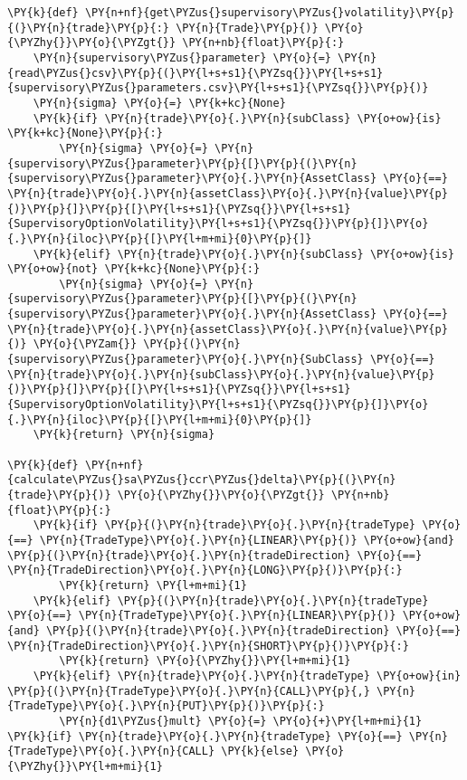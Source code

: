     \begin{tcolorbox}[breakable, size=fbox, boxrule=1pt, pad at break*=1mm,colback=cellbackground, colframe=cellborder]
\begin{Verbatim}[commandchars=\\\{\}]
\PY{k}{def} \PY{n+nf}{get\PYZus{}supervisory\PYZus{}volatility}\PY{p}{(}\PY{n}{trade}\PY{p}{:} \PY{n}{Trade}\PY{p}{)} \PY{o}{\PYZhy{}}\PY{o}{\PYZgt{}} \PY{n+nb}{float}\PY{p}{:}
    \PY{n}{supervisory\PYZus{}parameter} \PY{o}{=} \PY{n}{read\PYZus{}csv}\PY{p}{(}\PY{l+s+s1}{\PYZsq{}}\PY{l+s+s1}{supervisory\PYZus{}parameters.csv}\PY{l+s+s1}{\PYZsq{}}\PY{p}{)}
    \PY{n}{sigma} \PY{o}{=} \PY{k+kc}{None}
    \PY{k}{if} \PY{n}{trade}\PY{o}{.}\PY{n}{subClass} \PY{o+ow}{is} \PY{k+kc}{None}\PY{p}{:}
        \PY{n}{sigma} \PY{o}{=} \PY{n}{supervisory\PYZus{}parameter}\PY{p}{[}\PY{p}{(}\PY{n}{supervisory\PYZus{}parameter}\PY{o}{.}\PY{n}{AssetClass} \PY{o}{==} \PY{n}{trade}\PY{o}{.}\PY{n}{assetClass}\PY{o}{.}\PY{n}{value}\PY{p}{)}\PY{p}{]}\PY{p}{[}\PY{l+s+s1}{\PYZsq{}}\PY{l+s+s1}{SupervisoryOptionVolatility}\PY{l+s+s1}{\PYZsq{}}\PY{p}{]}\PY{o}{.}\PY{n}{iloc}\PY{p}{[}\PY{l+m+mi}{0}\PY{p}{]}
    \PY{k}{elif} \PY{n}{trade}\PY{o}{.}\PY{n}{subClass} \PY{o+ow}{is} \PY{o+ow}{not} \PY{k+kc}{None}\PY{p}{:}
        \PY{n}{sigma} \PY{o}{=} \PY{n}{supervisory\PYZus{}parameter}\PY{p}{[}\PY{p}{(}\PY{n}{supervisory\PYZus{}parameter}\PY{o}{.}\PY{n}{AssetClass} \PY{o}{==} \PY{n}{trade}\PY{o}{.}\PY{n}{assetClass}\PY{o}{.}\PY{n}{value}\PY{p}{)} \PY{o}{\PYZam{}} \PY{p}{(}\PY{n}{supervisory\PYZus{}parameter}\PY{o}{.}\PY{n}{SubClass} \PY{o}{==} \PY{n}{trade}\PY{o}{.}\PY{n}{subClass}\PY{o}{.}\PY{n}{value}\PY{p}{)}\PY{p}{]}\PY{p}{[}\PY{l+s+s1}{\PYZsq{}}\PY{l+s+s1}{SupervisoryOptionVolatility}\PY{l+s+s1}{\PYZsq{}}\PY{p}{]}\PY{o}{.}\PY{n}{iloc}\PY{p}{[}\PY{l+m+mi}{0}\PY{p}{]}
    \PY{k}{return} \PY{n}{sigma}

\PY{k}{def} \PY{n+nf}{calculate\PYZus{}sa\PYZus{}ccr\PYZus{}delta}\PY{p}{(}\PY{n}{trade}\PY{p}{)} \PY{o}{\PYZhy{}}\PY{o}{\PYZgt{}} \PY{n+nb}{float}\PY{p}{:}
    \PY{k}{if} \PY{p}{(}\PY{n}{trade}\PY{o}{.}\PY{n}{tradeType} \PY{o}{==} \PY{n}{TradeType}\PY{o}{.}\PY{n}{LINEAR}\PY{p}{)} \PY{o+ow}{and} \PY{p}{(}\PY{n}{trade}\PY{o}{.}\PY{n}{tradeDirection} \PY{o}{==} \PY{n}{TradeDirection}\PY{o}{.}\PY{n}{LONG}\PY{p}{)}\PY{p}{:}
        \PY{k}{return} \PY{l+m+mi}{1}
    \PY{k}{elif} \PY{p}{(}\PY{n}{trade}\PY{o}{.}\PY{n}{tradeType} \PY{o}{==} \PY{n}{TradeType}\PY{o}{.}\PY{n}{LINEAR}\PY{p}{)} \PY{o+ow}{and} \PY{p}{(}\PY{n}{trade}\PY{o}{.}\PY{n}{tradeDirection} \PY{o}{==} \PY{n}{TradeDirection}\PY{o}{.}\PY{n}{SHORT}\PY{p}{)}\PY{p}{:}
        \PY{k}{return} \PY{o}{\PYZhy{}}\PY{l+m+mi}{1}
    \PY{k}{elif} \PY{n}{trade}\PY{o}{.}\PY{n}{tradeType} \PY{o+ow}{in} \PY{p}{(}\PY{n}{TradeType}\PY{o}{.}\PY{n}{CALL}\PY{p}{,} \PY{n}{TradeType}\PY{o}{.}\PY{n}{PUT}\PY{p}{)}\PY{p}{:}
        \PY{n}{d1\PYZus{}mult} \PY{o}{=} \PY{o}{+}\PY{l+m+mi}{1} \PY{k}{if} \PY{n}{trade}\PY{o}{.}\PY{n}{tradeType} \PY{o}{==} \PY{n}{TradeType}\PY{o}{.}\PY{n}{CALL} \PY{k}{else} \PY{o}{\PYZhy{}}\PY{l+m+mi}{1}
        

\end{Verbatim}
\end{tcolorbox}
